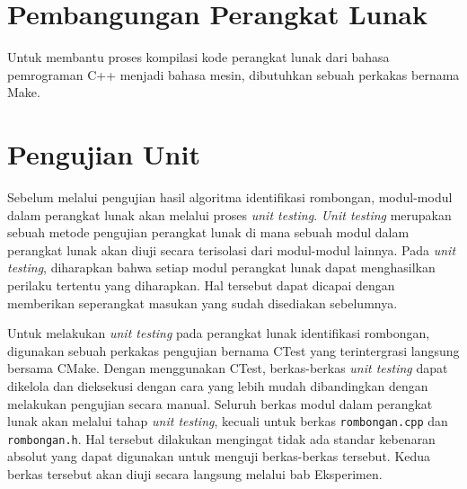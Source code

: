 \section{Pembangungan Perangkat Lunak}
\label{sec:build-tools}

Untuk membantu proses kompilasi kode perangkat lunak dari bahasa pemrograman C++ menjadi bahasa mesin, dibutuhkan sebuah perkakas bernama Make.

\section{Pengujian Unit}
\label{sec:unit-test}

Sebelum melalui pengujian hasil algoritma identifikasi rombongan, modul-modul dalam perangkat lunak akan melalui proses \textit{unit testing}. \textit{Unit testing} merupakan sebuah metode pengujian perangkat lunak di mana sebuah modul dalam perangkat lunak akan diuji secara terisolasi dari modul-modul lainnya. Pada \textit{unit testing}, diharapkan bahwa setiap modul perangkat lunak dapat menghasilkan perilaku tertentu yang diharapkan. Hal tersebut dapat dicapai dengan memberikan seperangkat masukan yang sudah disediakan sebelumnya.

Untuk melakukan \textit{unit testing} pada perangkat lunak identifikasi rombongan, digunakan sebuah perkakas pengujian bernama CTest yang terintergrasi langsung bersama CMake. Dengan menggunakan CTest, berkas-berkas \textit{unit testing} dapat dikelola dan dieksekusi dengan cara yang lebih mudah dibandingkan dengan melakukan pengujian secara manual. Seluruh berkas modul dalam perangkat lunak akan melalui tahap \textit{unit testing}, kecuali untuk berkas \texttt{rombongan.cpp} dan \texttt{rombongan.h}. Hal tersebut dilakukan mengingat tidak ada standar kebenaran absolut yang dapat digunakan untuk menguji berkas-berkas tersebut. Kedua berkas tersebut akan diuji secara langsung melalui bab Eksperimen.
